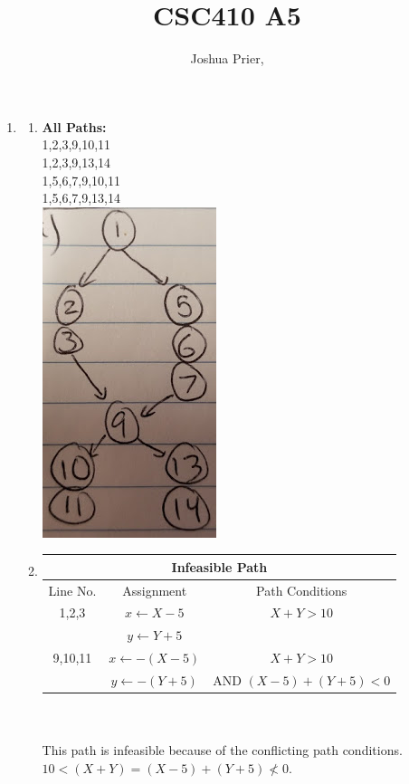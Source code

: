 \documentclass[a4paper,12pt]{article}
\title{CSC410 A5}
\author{Joshua Prier, }
\begin{document}
	\maketitle
	
	\begin{enumerate}
		\item 
			\begin{enumerate}
				\item \textbf{All Paths:}\\
				1,2,3,9,10,11\\
				1,2,3,9,13,14\\
				1,5,6,7,9,10,11\\
				1,5,6,7,9,13,14\\
				\includegraphics[scale=.5]{q1graph.jpg}
				\item 
					\begin{tabular}{|c|c|c|}
						\hline
						\multicolumn{3}{|c|}{Infeasible Path} \\
						\hline
						Line No. & Assignment & Path Conditions \\
						\hline
						1,2,3   & $x\leftarrow X-5$ & $X+Y > 10$ \\
						  ~ & $y\leftarrow Y+5$ & ~   \\
						\hline
						9,10,11  & $x\leftarrow -(X-5)$ & $X+Y > 10$ \\
						~ & $y\leftarrow -(Y+5)$ & AND $ (X-5) + (Y+5) < 0$   \\
						\hline
					\end{tabular} ~\\\\
				This path is infeasible because of the conflicting path conditions. $10 < (X+Y) = (X-5) + (Y+5) \nless 0$.

\end{enumerate}
\end{enumerate}
\end{document}
